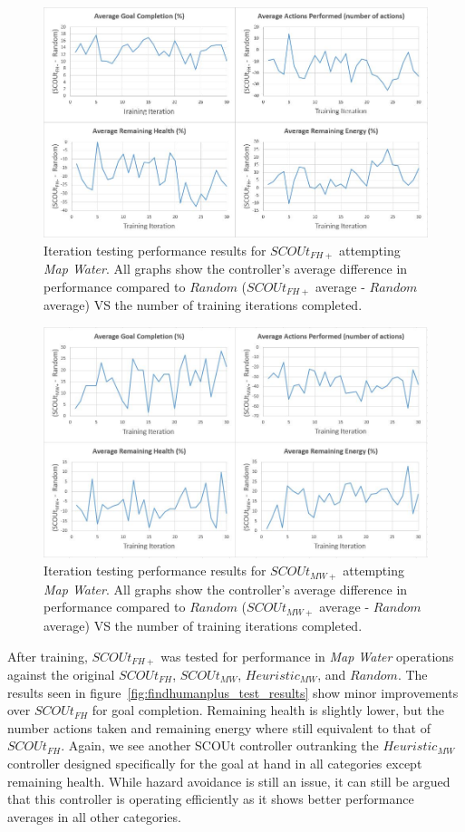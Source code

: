 \begin{figure}[!htb]
  \includegraphics[width=0.9\columnwidth]{Figures/Results/Experiment2/AdditionalTraining/FHPlus_Training.JPG}
  \caption{Iteration testing performance results for $SCOUt_{FH+}$ attempting \textit{Map Water}. All graphs show the controller's average difference in performance compared to $Random$ ($SCOUt_{FH+}$ average - $Random$ average) VS the number of training iterations completed.}
  \label{fig:findhumanplus_training_results}
\end{figure}

\begin{figure}[!htb]
  \includegraphics[width=0.9\columnwidth]{Figures/Results/Experiment2/AdditionalTraining/MWPlus_Training.JPG}
  \caption{Iteration testing performance results for $SCOUt_{MW+}$ attempting \textit{Map Water}. All graphs show the controller's average difference in performance compared to $Random$ ($SCOUt_{MW+}$ average - $Random$ average) VS the number of training iterations completed.}
  \label{fig:mapwaterplus_training_results}
\end{figure}


After training, $SCOUt_{FH+}$ was tested for performance in \textit{Map Water} operations against the original $SCOUt_{FH}$, $SCOUt_{MW}$, $Heuristic_{MW}$, and $Random$.
The results seen in figure~\ref{fig:findhumanplus_test_results} show minor improvements over $SCOUt_{FH}$ for goal completion.
Remaining health is slightly lower, but the number actions taken and remaining energy where still equivalent to that of $SCOUt_{FH}$.
Again, we see another SCOUt controller outranking the $Heuristic_{MW}$ controller designed specifically for the goal at hand in all categories except remaining health.
While hazard avoidance is still an issue, it can still be argued that this controller is operating efficiently as it shows better performance averages in all other categories.

